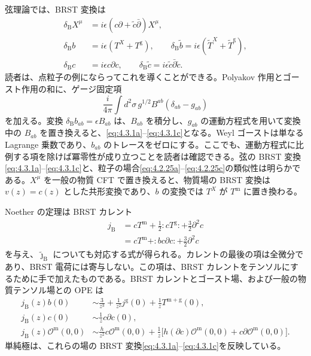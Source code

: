 弦理論では、BRST 変換は
\begin{align}
\delta_{\mathrm B}X^\mu&=i\epsilon(c\partial+\widetilde c\bar\partial)X^\mu,
\tag{4.3.1a}\label{eq:4.3.1a}\\
\delta_{\mathrm B}b&=i\epsilon(T^X+T^{\mathrm g}),
\qquad \delta_{\mathrm B}\widetilde b=i\epsilon(\widetilde T^X+\widetilde T^{\mathrm g}),
\tag{4.3.1b}\label{eq:4.3.1b}\\
\delta_{\mathrm B}c&=i\epsilon c\partial c,
\qquad \delta_{\mathrm B}\widetilde c=i\epsilon\widetilde c\bar\partial\widetilde c.
\tag{4.3.1c}\label{eq:4.3.1c}
\end{align}
読者は、点粒子の例にならってこれを導くことができる。Polyakov 作用とゴースト作用の和に、ゲージ固定項
\begin{equation}
\frac i{4\pi}\int d^2\sigma\,g^{1/2}B^{ab}(\delta_{ab}-g_{ab})
\tag{4.3.2}\label{eq:4.3.2}
\end{equation}
を加える。変換 $\delta_{\mathrm B}b_{ab}=\epsilon B_{ab}$ は、$B_{ab}$ を積分し、$g_{ab}$ の運動方程式を用いて変換中の $B_{ab}$ を置き換えると、\eqref{eq:4.3.1a}--\eqref{eq:4.3.1c}となる。Weyl ゴーストは単なる Lagrange 乗数であり、$b_{ab}$ のトレースをゼロにする。ここでも、運動方程式に比例する項を除けば冪零性が成り立つことを読者は確認できる。弦の BRST 変換\eqref{eq:4.3.1a}--\eqref{eq:4.3.1c}と、粒子の場合\eqref{eq:4.2.25a}--\eqref{eq:4.2.25c}の類似性は明らかである。$X^\mu$ を一般の物質 CFT で置き換えると、物質場の BRST 変換は $v(z)=c(z)$ とした共形変換であり、$b$ の変換では $T^X$ が $T^{\mathrm m}$ に置き換わる。

Noether の定理は BRST カレント
\begin{equation}
\begin{aligned}
j_{\mathrm B}&=cT^{\mathrm m}+\frac12:cT^{\mathrm g}:+\frac32\partial^2c\\
&=cT^{\mathrm m}+:bc\partial c:+\frac32\partial^2c
\end{aligned}
\tag{4.3.3}\label{eq:4.3.3}
\end{equation}
を与え、$\widetilde{\jmath}_{\mathrm B}$ についても対応する式が得られる。カレントの最後の項は全微分であり、BRST 電荷には寄与しない。この項は、BRST カレントをテンソルにするために手で加えたものである。BRST カレントとゴースト場、および一般の物質テンソル場との OPE は
\begin{align}
j_{\mathrm B}(z)b(0)&\sim\frac3{z^3}+\frac1{z^2}j^{\mathrm g}(0)
+\frac1zT^{\mathrm{m+g}}(0),
\tag{4.3.4a}\label{eq:4.3.4a}\\
j_{\mathrm B}(z)c(0)&\sim\frac1z c\partial c(0),
\tag{4.3.4b}\label{eq:4.3.4b}\\
j_{\mathrm B}(z)\mathcal O^{\mathrm m}(0,0)
&\sim\frac h{z^2}c\mathcal O^{\mathrm m}(0,0)
+\frac1z\bigl[h(\partial c)\mathcal O^{\mathrm m}(0,0)
+c\partial\mathcal O^{\mathrm m}(0,0)\bigr].
\tag{4.3.4c}\label{eq:4.3.4c}
\end{align}
単純極は、これらの場の BRST 変換\eqref{eq:4.3.1a}--\eqref{eq:4.3.1c}を反映している。

